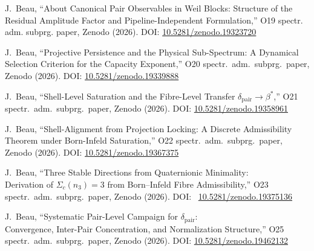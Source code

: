 J.~Beau,
``About Canonical Pair Observables in Weil Blocks: Structure of the Residual Amplitude Factor and Pipeline-Independent
Formulation,''
O19 spectr. adm. subprg. paper, Zenodo (2026).
DOI: \href{https://doi.org/10.5281/zenodo.19323720}{10.5281/zenodo.19323720}

J.~Beau,
``Projective Persistence and the Physical Sub-Spectrum: A
Dynamical Selection Criterion for the Capacity Exponent,''
O20 spectr.\ adm.\ subprg.\ paper, Zenodo (2026).
DOI: \href{https://doi.org/10.5281/zenodo.19339888}{10.5281/zenodo.19339888}

J.~Beau,
``Shell-Level Saturation and the Fibre-Level Transfer
$\delta_{\mathrm{pair}} \to \beta^*$,''
O21 spectr.\ adm.\ subprg.\ paper, Zenodo (2026).
DOI: \href{https://doi.org/10.5281/zenodo.19358961}{10.5281/zenodo.19358961}

J.~Beau,
``Shell-Alignment from Projection Locking: A Discrete Admissibility Theorem under Born-Infeld Saturation,''
O22 spectr.\ adm.\ subprg.\ paper, Zenodo (2026).
DOI: \href{https://doi.org/10.5281/zenodo.19367375}{10.5281/zenodo.19367375}

J.~Beau,
``Three Stable Directions from Quaternionic Minimality:\\
Derivation of $\Sigma_{c}(n_{3}) = 3$ from Born--Infeld Fibre Admissibility,''
O23 spectr.\ adm.\ subprg.\ paper, Zenodo (2026).
DOI:  \href{https://doi.org/10.5281/zenodo.19375136}{10.5281/zenodo.19375136}

J.~Beau,
``Systematic Pair-Level Campaign for $\delta_{\mathrm{pair}}$:\\
Convergence, Inter-Pair Concentration, and Normalization Structure,''
O25 spectr.\ adm.\ subprg.\ paper, Zenodo (2026).
DOI:  \href{https://doi.org/10.5281/zenodo.19462132}{10.5281/zenodo.19462132}
